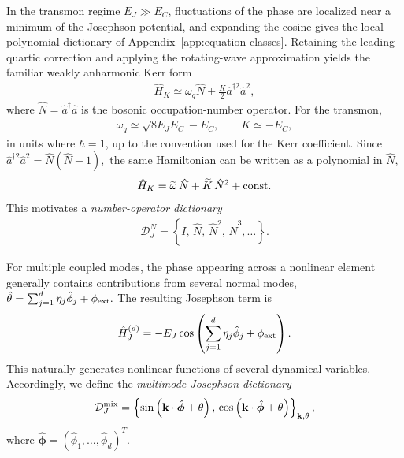 \documentclass[pra,twocolumn,superscriptaddress,nofootinbib,floatfix]{revtex4-2}
\theoremstyle{remark}
\newcommand{\revcolor}{\color{blue}}
\DeclareRobustCommand{\rev}[1]{{\revcolor #1}}
\begin{document}
\rev{In the transmon regime \(E_J\gg E_C\), fluctuations of the phase are localized near a minimum of the Josephson potential, and expanding the cosine gives the local polynomial dictionary of Appendix~\ref{app:equation-classes}.} Retaining the leading quartic correction and applying the rotating-wave approximation yields the familiar weakly anharmonic Kerr form
\begin{align}
\hat H_K\simeq\omega_q \hat N+\frac{K}{2}\hat a^{\dagger 2}\hat a^2,
\label{eq:kerr-hamiltonian}
\end{align}
where $\hat N=\hat a^\dagger\hat a$ is the bosonic occupation-number operator. For the transmon,
\begin{align}
\omega_q\simeq\sqrt{8E_JE_C}-E_C,\qquad K\simeq -E_C,
\end{align}
in units where \(\hbar=1\), up to the convention used for the Kerr coefficient. Since \(\hat a^{\dagger 2}\hat a^2=\hat N(\hat N-1),\) the same Hamiltonian can be written as a polynomial in \(\hat N\),
\begin{align}
\hat H_K=\widetilde\omega\,\hat N+\widetilde K\,\hat N^2+{\rm const.}
\end{align}
This motivates a \emph{number-operator dictionary}
\begin{align}
\mathcal D_{J}^{N}=\left\{I,\,\hat N,\,\hat N^2,\,\hat N^3,\ldots\right\}.
\label{eq:number-dictionary}
\end{align}

For multiple coupled modes, the phase appearing across a nonlinear element generally contains contributions from several normal modes, \(\hat\theta=\sum_{j=1}^{d}\eta_j\hat\phi_j+\phi_{\rm ext}.\) The resulting Josephson term is
\begin{align}
\hat H_J^{(d)}=-E_J\cos\left(\sum_{j=1}^{d}\eta_j\hat\phi_j+\phi_{\rm ext}\right).
\label{eq:multimode-josephson}
\end{align}
This naturally generates nonlinear functions of several dynamical variables. Accordingly, we define the \emph{multimode Josephson dictionary}
\begin{align}
\mathcal D_{J}^{\rm mix}=\left\{\sin\left(\mathbf k\cdot\hat{\boldsymbol\phi}+\theta\right),\,\cos\left(\mathbf k\cdot\hat{\boldsymbol\phi}+\theta\right)\right\}_{\mathbf k,\theta},
\label{eq:multimode-dictionary}
\end{align}
where $\hat{\boldsymbol\phi}=(\hat\phi_1,\ldots,\hat\phi_d)^T.$
\end{document}
